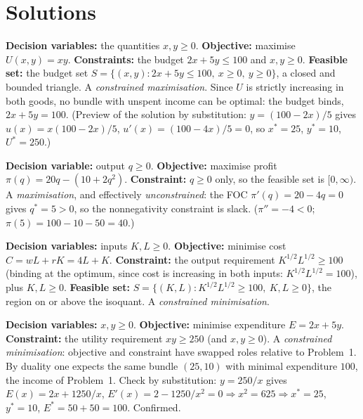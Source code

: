 \section{Solutions}

\begin{solutions}
  \item \textbf{Decision variables:} the quantities $x,y\ge 0$.
        \textbf{Objective:} maximise $U(x,y)=xy$.
        \textbf{Constraints:} the budget $2x+5y\le 100$ and $x,y\ge 0$.
        \textbf{Feasible set:} the budget set
        $S=\{(x,y): 2x+5y\le 100,\ x\ge 0,\ y\ge 0\}$, a closed and
        bounded triangle. A \emph{constrained maximisation}. Since $U$
        is strictly increasing in both goods, no bundle with unspent
        income can be optimal: the budget binds, $2x+5y=100$.
        (Preview of the solution by substitution: $y=(100-2x)/5$ gives
        $u(x)=x(100-2x)/5$, $u'(x)=(100-4x)/5=0$, so $x^{*}=25$,
        $y^{*}=10$, $U^{*}=250$.)

  \item \textbf{Decision variable:} output $q\ge 0$.
        \textbf{Objective:} maximise profit
        $\pi(q)=20q-(10+2q^{2})$.
        \textbf{Constraint:} $q\ge 0$ only, so the feasible set is
        $[0,\infty)$. A \emph{maximisation}, and effectively
        \emph{unconstrained}: the FOC $\pi'(q)=20-4q=0$ gives
        $q^{*}=5>0$, so the nonnegativity constraint is slack.
        ($\pi''=-4<0$; $\pi(5)=100-10-50=40$.)

  \item \textbf{Decision variables:} inputs $K,L\ge 0$.
        \textbf{Objective:} minimise cost $C=wL+rK=4L+K$.
        \textbf{Constraint:} the output requirement
        $K^{1/2}L^{1/2}\ge 100$ (binding at the optimum, since cost is
        increasing in both inputs: $K^{1/2}L^{1/2}=100$), plus
        $K,L\ge 0$.
        \textbf{Feasible set:}
        $S=\{(K,L): K^{1/2}L^{1/2}\ge 100,\ K,L\ge 0\}$, the region on
        or above the isoquant. A \emph{constrained minimisation}.

  \item \textbf{Decision variables:} $x,y\ge 0$.
        \textbf{Objective:} minimise expenditure $E=2x+5y$.
        \textbf{Constraint:} the utility requirement $xy\ge 250$ (and
        $x,y\ge 0$).
        A \emph{constrained minimisation}: objective and constraint
        have swapped roles relative to Problem~1. By duality one
        expects the same bundle $(25,10)$ with minimal expenditure
        $100$, the income of Problem~1. Check by substitution:
        $y=250/x$ gives $E(x)=2x+1250/x$,
        $E'(x)=2-1250/x^{2}=0 \Rightarrow x^{2}=625 \Rightarrow
        x^{*}=25$, $y^{*}=10$, $E^{*}=50+50=100$. Confirmed.


\end{solutions}
